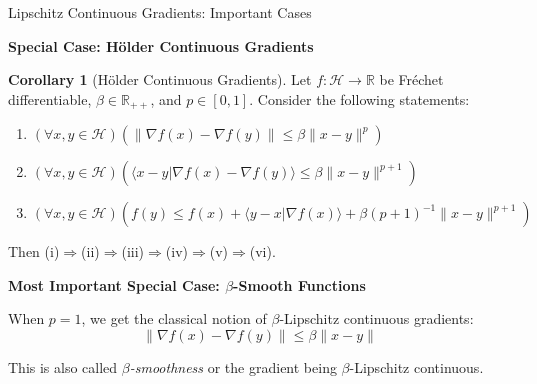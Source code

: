 \documentclass[aspectratio=169,10pt]{beamer}
\theoremstyle{definition}
\newtheorem{corollary}{Corollary}
\begin{document}
\begin{frame}{Lipschitz Continuous Gradients: Important Cases}

\textbf{Special Case: Hölder Continuous Gradients}

\begin{corollary}[Hölder Continuous Gradients]
Let $f: \mathcal{H} \to \mathbb{R}$ be Fréchet differentiable, $\beta \in \mathbb{R}_{++}$,
and $p \in [0,1]$. Consider the following statements:

\begin{enumerate}
  \item[(i)] $(\forall x, y \in \mathcal{H})(\|\nabla f(x) - \nabla f(y)\| \leq \beta\|x - y\|^p)$

  \item[(ii)] $(\forall x, y \in \mathcal{H})(\langle x - y | \nabla f(x) - \nabla f(y) \rangle \leq \beta\|x - y\|^{p+1})$

  \item[(iii)] $(\forall x, y \in \mathcal{H})(f(y) \leq f(x) + \langle y - x | \nabla f(x) \rangle + \beta(p+1)^{-1}\|x - y\|^{p+1})$
\end{enumerate}

Then (i)$\Rightarrow$(ii)$\Rightarrow$(iii)$\Rightarrow$(iv)$\Rightarrow$(v)$\Rightarrow$(vi).
\end{corollary}

\vspace{0.3cm}

\textbf{Most Important Special Case: $\beta$-Smooth Functions}

When $p = 1$, we get the classical notion of $\beta$-Lipschitz continuous gradients:
$$\|\nabla f(x) - \nabla f(y)\| \leq \beta\|x - y\|$$

This is also called \emph{$\beta$-smoothness} or the gradient being $\beta$-Lipschitz continuous.

\end{frame}
\end{document}
